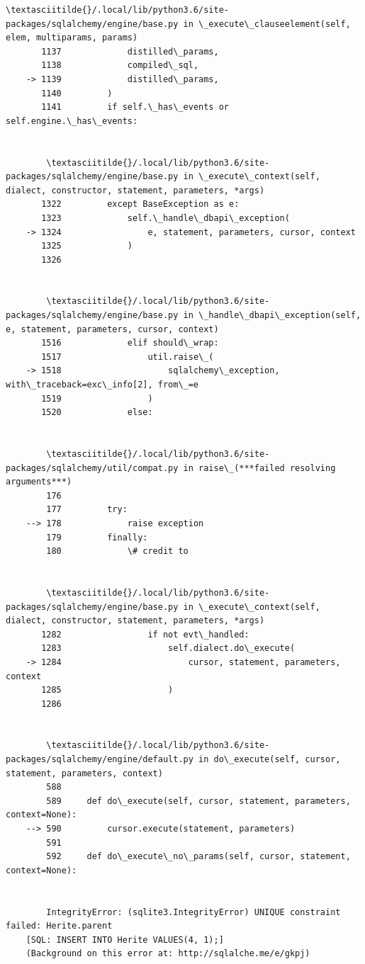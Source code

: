 \documentclass[11pt]{article}
\begin{document}
\begin{Verbatim}[commandchars=\\\{\}]
        \textasciitilde{}/.local/lib/python3.6/site-packages/sqlalchemy/engine/base.py in \_execute\_clauseelement(self, elem, multiparams, params)
       1137             distilled\_params,
       1138             compiled\_sql,
    -> 1139             distilled\_params,
       1140         )
       1141         if self.\_has\_events or self.engine.\_has\_events:


        \textasciitilde{}/.local/lib/python3.6/site-packages/sqlalchemy/engine/base.py in \_execute\_context(self, dialect, constructor, statement, parameters, *args)
       1322         except BaseException as e:
       1323             self.\_handle\_dbapi\_exception(
    -> 1324                 e, statement, parameters, cursor, context
       1325             )
       1326 


        \textasciitilde{}/.local/lib/python3.6/site-packages/sqlalchemy/engine/base.py in \_handle\_dbapi\_exception(self, e, statement, parameters, cursor, context)
       1516             elif should\_wrap:
       1517                 util.raise\_(
    -> 1518                     sqlalchemy\_exception, with\_traceback=exc\_info[2], from\_=e
       1519                 )
       1520             else:


        \textasciitilde{}/.local/lib/python3.6/site-packages/sqlalchemy/util/compat.py in raise\_(***failed resolving arguments***)
        176 
        177         try:
    --> 178             raise exception
        179         finally:
        180             \# credit to


        \textasciitilde{}/.local/lib/python3.6/site-packages/sqlalchemy/engine/base.py in \_execute\_context(self, dialect, constructor, statement, parameters, *args)
       1282                 if not evt\_handled:
       1283                     self.dialect.do\_execute(
    -> 1284                         cursor, statement, parameters, context
       1285                     )
       1286 


        \textasciitilde{}/.local/lib/python3.6/site-packages/sqlalchemy/engine/default.py in do\_execute(self, cursor, statement, parameters, context)
        588 
        589     def do\_execute(self, cursor, statement, parameters, context=None):
    --> 590         cursor.execute(statement, parameters)
        591 
        592     def do\_execute\_no\_params(self, cursor, statement, context=None):


        IntegrityError: (sqlite3.IntegrityError) UNIQUE constraint failed: Herite.parent
    [SQL: INSERT INTO Herite VALUES(4, 1);]
    (Background on this error at: http://sqlalche.me/e/gkpj)

    \end{Verbatim}
\end{document}
